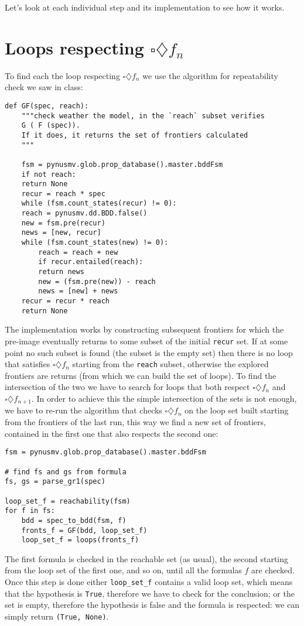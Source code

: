 \documentclass[10pt]{article}
\begin{document}
Let's look at each individual step and its implementation to see how
it works.

\section*{Loops respecting \(\square\diamondsuit f_n\)}
\label{sec:org6f82694}
To find each the loop respecting \(\square\diamondsuit f_n\) we use
the algorithm for repeatability check we saw in class:

\begin{verbatim}
def GF(spec, reach):
    """check weather the model, in the `reach` subset verifies
    G ( F (spec)).
    If it does, it returns the set of frontiers calculated
    """

    fsm = pynusmv.glob.prop_database().master.bddFsm
    if not reach:
	return None
    recur = reach * spec
    while (fsm.count_states(recur) != 0):
	reach = pynusmv.dd.BDD.false()
	new = fsm.pre(recur)
	news = [new, recur]
	while (fsm.count_states(new) != 0):
	    reach = reach + new 
	    if recur.entailed(reach):
		return news
	    new = (fsm.pre(new)) - reach
	    news = [new] + news
	recur = recur * reach
    return None
\end{verbatim}

The implementation works by constructing subsequent frontiers for
which the pre-image eventually returns to some subset of the initial
\texttt{recur} set. If at some point no such subset is found (the subset is
the empty set) then there is no loop that satisfies
\(\square\diamondsuit f_n\) starting from the \texttt{reach} subset,
otherwise the explored frontiers are returns (from which we can
build the set of loops).  To find the intersection of the two we
have to search for loops that both respect \(\square\diamondsuit
  f_n\) and \(\square\diamondsuit f_{n+1}\). In order to achieve this
the simple intersection of the sets is not enough, we have to re-run
the algorithm that checks \(\square\diamondsuit f_n\) on the loop
set built starting from the frontiers of the last run, this way we
find a new set of frontiers, contained in the first one that also
respects the second one:

\begin{verbatim}
fsm = pynusmv.glob.prop_database().master.bddFsm

# find fs and gs from formula
fs, gs = parse_gr1(spec)

loop_set_f = reachability(fsm)
for f in fs:
    bdd = spec_to_bdd(fsm, f)
    fronts_f = GF(bdd, loop_set_f)
    loop_set_f = loops(fronts_f)
\end{verbatim}
The first formula is checked in the reachable set (as usual), the
second starting from the loop set of the first one, and so on, until
all the formulas \(f\) are checked. Once this step is done either
\texttt{loop\_set\_f} contains a valid loop set, which means that the
hypothesis is \texttt{True}, therefore we have to check for the conclusion;
or the set is empty, therefore the hypothesis is false and the
formula is respected: we can simply return \texttt{(True, None)}.
\end{document}
